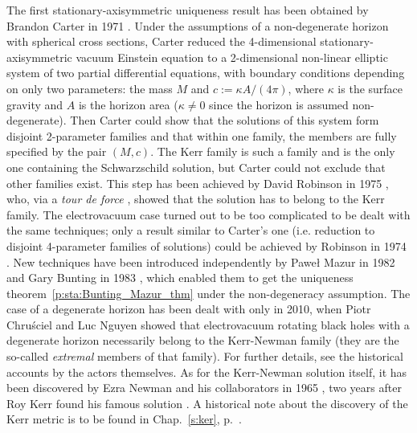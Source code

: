 \begin{hist}
\label{h:sta:axisym_uniqueness}
The first stationary-axisymmetric uniqueness result has been obtained
by Brandon Carter in 1971 \cite{Carte71}. Under the
assumptions of a non-degenerate horizon with spherical cross sections,
Carter reduced the 4-dimensional stationary-axisymmetric
vacuum Einstein equation to a 2-dimensional non-linear elliptic system
of two partial differential equations,
with boundary conditions depending on only two parameters: the mass $M$
and $c := \kappa A/(4\pi)$, where $\kappa$ is the surface gravity and $A$
is the horizon area ($\kappa \neq 0$ since the horizon is assumed non-degenerate).
Then Carter could show that the solutions
of this system form disjoint 2-parameter families and that within one family,
the members are fully specified by the pair $(M, c)$. The Kerr family is
such a family and is the only one containing the Schwarzschild solution, but
Carter could not exclude that other families exist. This step has been achieved
by David Robinson in 1975 \cite{Robin75}, who,
via a \emph{tour de force} \cite{Carte99}, showed
that the solution has to belong to the Kerr family.
The electrovacuum case turned out to be too complicated
to be dealt with the same techniques; only a result similar to Carter's
one (i.e. reduction to disjoint 4-parameter families of solutions)
could be achieved by Robinson in 1974 \cite{Robin74}.
New techniques have been introduced independently
by Pawe\l{} Mazur in 1982 \cite{Mazur82} and
Gary Bunting in 1983 \cite{Bunti83}, which enabled
them to get the uniqueness theorem~\ref{p:sta:Bunting_Mazur_thm}
under the non-degeneracy assumption. The case of a degenerate horizon
has been dealt with only in 2010, when Piotr Chru\'sciel
and Luc Nguyen \cite{ChrusN10}
showed that electrovacuum rotating black holes with a degenerate horizon
necessarily belong to the Kerr-Newman family (they are the so-called
\emph{extremal} members of that family).
For further details, see the historical accounts \cite{Carte99,Mazur01,Robin09}
by the actors themselves. As for the Kerr-Newman solution itself, it has
been discovered by Ezra Newman and his collaborators in 1965 \cite{Newma_al65}, two years after Roy Kerr
found his famous solution \cite{Kerr63}. A historical note about the discovery of the Kerr metric is to be found in Chap.~\ref{s:ker}, p.~\pageref{h:ker:Kerr_sol}.
\end{hist}

